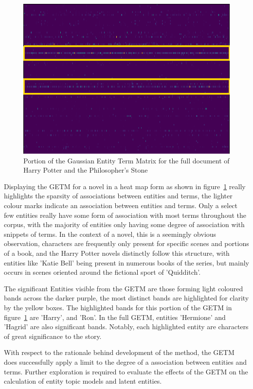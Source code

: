 \documentclass[10pt]{report}
\begin{document}
\begin{figure}[h!]
  \centering
  \includegraphics[scale=0.7]{phil_stone_getm_snippet}
  \caption{Portion of the Gaussian Entity Term Matrix for the full document of Harry Potter and the Philosopher's Stone\label{fig:hp_full_ps_getm}} 
\end{figure}

Displaying the GETM for a novel in a heat map form as shown in figure~\ref{fig:hp_full_ps_getm} really highlights the sparsity of associations between entities and terms, the lighter colour marks indicate an association between entities and terms. Only a select few entities really have some form of association with most terms throughout the corpus, with the majority of entities only having some degree of association with snippets of terms. In the context of a novel, this is a seemingly obvious observation, characters are frequently only present for specific scenes and portions of a book, and the Harry Potter novels distinctly follow this structure, with entities like 'Katie Bell' being present in numerous books of the series, but mainly occurs in scenes oriented around the fictional sport of 'Quidditch'.

The significant Entities visible from the GETM are those forming light coloured bands across the darker purple, the most distinct bands are highlighted for clarity by the yellow boxes. The highlighted bands for this portion of the GETM in figure~\ref{fig:hp_full_ps_getm} are 'Harry', and 'Ron'. In the full GETM, entities 'Hermione' and 'Hagrid' are also significant bands. Notably, each highlighted entity are characters of great significance to the story.

With respect to the rationale behind development of the method, the GETM does successfully apply a limit to the degree of a association between entities and terms. Further exploration is required to evaluate the effects of the GETM on the calculation of entity topic models and latent entities.
\end{document}
